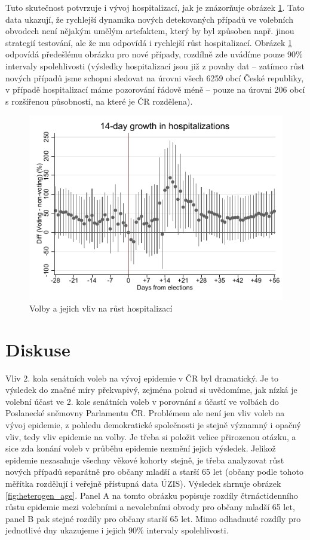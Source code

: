 Tuto skutečnost potvrzuje i vývoj hospitalizací, jak je znázorňuje obrázek \ref{fig:hospit_growth}. Tato data ukazují, že rychlejší dynamika nových detekovaných případů ve volebních obvodech není nějakým umělým artefaktem, který by byl způsoben např. jinou strategií testování, ale že mu odpovídá i rychlejší růst hospitalizací. Obrázek  \ref{fig:hospit_growth} odpovídá předešlému obrázku pro nové případy, rozdílně zde uvádíme pouze 90\% intervaly spolehlivosti (výsledky hospitalizací jsou  již z povahy dat -- zatímco růst nových případů jsme schopni sledovat na úrovni všech 6259 obcí České republiky, v případě hospitalizací máme pozorování řádově méně -- pouze na úrovni 206 obcí s rozšířenou působností, na které je ČR rozdělena).

\begin{figure}    
    \centering
    \includegraphics[scale=1]{Hospitalization_growth14.pdf}
    \caption{Volby a jejich vliv na růst hospitalizací}
     \label{fig:hospit_growth}
\end{figure}

\section*{Diskuse}
Vliv 2. kola senátních voleb na vývoj epidemie v ČR byl dramatický. Je to výsledek do značné míry překvapivý, zejména pokud si uvědomíme, jak nízká je volební účast ve 2. kole senátních voleb v porovnání s účastí ve volbách do Poslanecké sněmovny Parlamentu ČR. Problémem ale není jen vliv voleb na vývoj epidemie, z pohledu demokratické společnosti je stejně významný i opačný vliv, tedy vliv epidemie na volby. Je třeba si položit velice přirozenou otázku, a sice zda konání voleb v průběhu epidemie nezmění jejich výsledek. Jelikož epidemie nezasahuje všechny věkové kohorty stejně, je třeba analyzovat růst nových případů separátně pro občany mladší a starší 65 let (občany podle tohoto měřítka rozdělují i veřejně přístupná data ÚZIS). Výsledek shrnuje obrázek  \ref{fig:heterogen_age}. Panel A na tomto obrázku popisuje rozdíly čtrnáctidenního růstu epidemie mezi volebními a nevolebními obvody pro občany mladší 65 let, panel B pak stejné rozdíly pro občany starší 65 let. Mimo odhadnuté rozdíly pro jednotlivé dny ukazujeme i jejich 90\% intervaly spolehlivosti.

